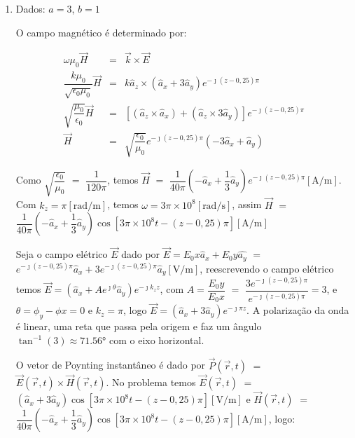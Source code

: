 \begin{enumerate}[1.]

\item Dados: $a = 3$, $b = 1$  %

O campo magnético é determinado por:

\begin{eqnarray*}
  \omega \mu_{0} \vec{H} & = &  \vec{k} \times \vec{E} \nonumber \\
  \dfrac{k \mu_{0}}{\sqrt{\epsilon_{0}\mu_{0}}} \vec{H} & = & k\hat{a}_{z} \times (\hat{a}_{x} + 3\hat{a}_{y})e^{-\jmath (z - 0,25)\pi} \nonumber \\
  \sqrt{\dfrac{\mu_{0}}{\epsilon_{0}}} \vec{H} & = & \left[ (\hat{a}_{z} \times \hat{a}_{x}) + (\hat{a}_{z} \times 3\hat{a}_{y}) \right]e^{-\jmath (z - 0,25)\pi} \nonumber \\
  \vec{H} & = & \sqrt{\dfrac{\epsilon_{0}}{\mu_{0}}}e^{-\jmath (z - 0,25)\pi}\left(-3\hat{a}_{x} + \hat{a}_{y}\right) \nonumber
\end{eqnarray*}

Como $\sqrt{\dfrac{\epsilon_{0}}{\mu_{0}}}$ $=$ $\dfrac{1}{120\pi}$, temos $\vec{H}$ $=$ $\dfrac{1}{40\pi}\left(-\hat{a}_{x} + \dfrac{1}{3}\hat{a}_{y}\right)e^{-\jmath (z - 0,25)\pi} [\si{\ampere/\meter}]$. Com $k_{z} = \pi [\si{\radian/\meter}]$, temos $\omega = 3\pi \times 10^{8} [\si{\radian/\second}]$, assim $\vec{H}$ $=$ $\dfrac{1}{40\pi}\left(-\hat{a}_{x} + \dfrac{1}{3}\hat{a}_{y}\right)\cos[3\pi \times 10^{8}t - (z - 0,25)\pi] [\si{\ampere/\meter}]$

Seja o campo elétrico $\vec{E}$ dado por $\vec{E} = E_{0}x \hat{a}_{x} + E_{0}y \hat{ a_{y}}$  $=$ $e^{-\jmath (z - 0,25) \pi} \hat{a}_{x} + 3 e^{-\jmath (z - 0,25)\pi} \hat{a}_{y} [\si{\volt/\meter}]$, reescrevendo o campo elétrico temos $\vec{E} = (\hat{a}_{x} + A e^{\jmath \theta} \hat{a}_{y})e^{-\jmath k_{z} z}$, com $A = \dfrac{E_{0}y}{E_{0}x}$ $=$ $\dfrac{3 e^{-\jmath (z - 0,25)\pi}}{e^{-\jmath (z - 0,25) \pi}} = 3$, e $\theta = \phi_{y} - \phi{x}  = 0$ e $k_{z} = \pi$, logo $\vec{E} = (\hat{a}_{x} + 3 \hat{a}_{y})e^{-\jmath \pi z}$. A polarização da onda é linear, uma reta que passa pela origem e faz um ângulo $\tan^{-1}(3) \approx 71.56\si{\degree}$ com o eixo horizontal.

O vetor de Poynting instantâneo é dado por $\vec{P}(\vec{r},t)$ $=$ $\vec{E}(\vec{r},t) \times \vec{H}(\vec{r},t)$. No problema temos $\vec{E}(\vec{r},t)$ $=$ $\left(\hat{a}_{x} + 3\hat{a}_{y}\right)\cos[3\pi \times 10^{8}t - (z - 0,25)\pi] [\si{\volt/\meter}]$ e $\vec{H}(\vec{r},t)$ $=$ $\dfrac{1}{40\pi}\left(-\hat{a}_{x} + \dfrac{1}{3}\hat{a}_{y}\right)\cos[3\pi \times 10^{8}t - (z - 0,25)\pi] [\si{\ampere/\meter}]$, logo:


\end{enumerate}
